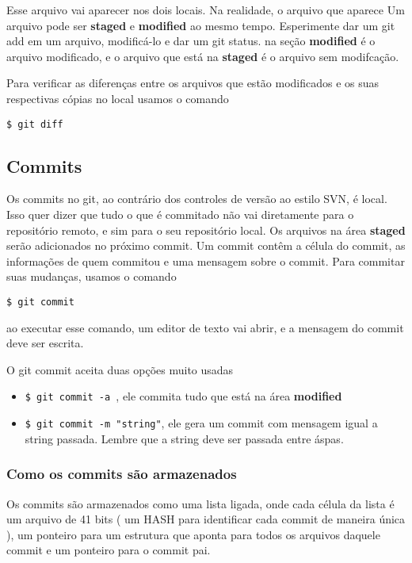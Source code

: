 \documentclass{article}
\begin{document}
Esse arquivo vai aparecer nos dois locais. Na realidade, o arquivo que aparece
    Um arquivo pode ser \textbf{staged} e \textbf{modified} ao mesmo tempo.
Esperimente dar um git add em um arquivo, modificá-lo e dar um git status.
na seção \textbf{modified} é o arquivo modificado, e o arquivo que está na
\textbf{staged} é o arquivo sem modifcação.

    Para verificar as diferenças entre os arquivos que estão modificados e
os suas respectivas cópias no local usamos o comando
\begin{tabbing}
    \hspace{1cm}\=\verb#$ git diff#
\end{tabbing}

    
\subsection{Commits}
    Os commits no git, ao contrário dos controles de versão ao estilo SVN,
é local. Isso quer dizer que tudo o que é commitado não vai diretamente para
o repositório remoto, e sim para o seu repositório local. Os arquivos na área
\textbf{staged} serão adicionados no próximo commit. Um commit contêm a célula
do commit, as informações de quem commitou e uma mensagem sobre o commit. Para
commitar suas mudanças, usamos o comando
\begin{tabbing}
    \hspace{1cm}\=\verb#$ git commit#
\end{tabbing}
    ao executar esse comando, um editor de texto vai abrir, e a mensagem do commit
deve ser escrita.
    
    O git commit aceita duas opções muito usadas
    \begin{itemize}
        \item \verb#$ git commit -a #, ele commita tudo que está na área \textbf{modified}
        \item \verb#$ git commit -m "string"#, ele gera um commit com mensagem igual a string passada.
            Lembre que a string deve ser passada entre áspas.
    \end{itemize}

\subsubsection{Como os commits são armazenados}
    Os commits são armazenados como uma lista ligada, onde cada célula da lista
é um arquivo de 41 bits ( um HASH para identificar cada commit de maneira única ),
um ponteiro para um estrutura que aponta para todos os arquivos daquele commit e
um ponteiro para o commit pai.
\end{document}
